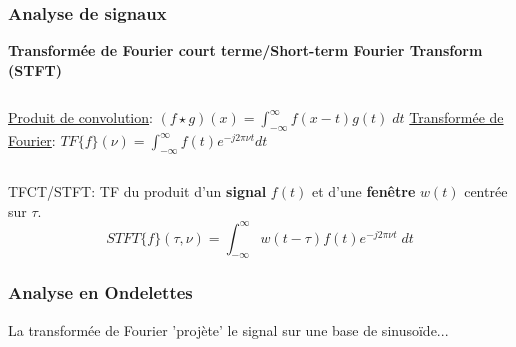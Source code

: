 \documentclass{beamer}
\begin{document}
\begin{frame}
\frametitle{Analyse de signaux}
\textbf{Transformée de Fourier court terme/Short-term Fourier Transform (STFT)}
\vspace{1cm}
\begin{columns}
\column{60mm}
\underline{Produit de convolution}:
$(f \star g) (x) =  \displaystyle \int^{\infty}_{-\infty} f(x-t)g(t) \; dt  $
\column{60mm}
\underline{Transformée de Fourier}:
	$ TF\{ f \}(\nu) = \displaystyle \int^{\infty}_{-\infty} f(t) e^{-j2\pi \nu t} dt $
\end{columns}
\vspace{1cm}
TFCT/STFT: TF du produit d'un \textbf{signal} $f(t)$ et d'une \textbf{fenêtre} $w(t)$ centrée sur $\tau$.\\

\[ \boxed{STFT\{ f \}(\tau,\nu) =  \int^{\infty}_{-\infty} w(t-\tau )f(t) e^{-j2\pi \nu t }\; dt} \] 

\end{frame}

%
%

\begin{frame}
\frametitle{Analyse en Ondelettes}
La transformée de Fourier 'projète' le signal sur une base de sinusoïde...\\
\vspace{0.5cm}
\end{frame}
\end{document}
